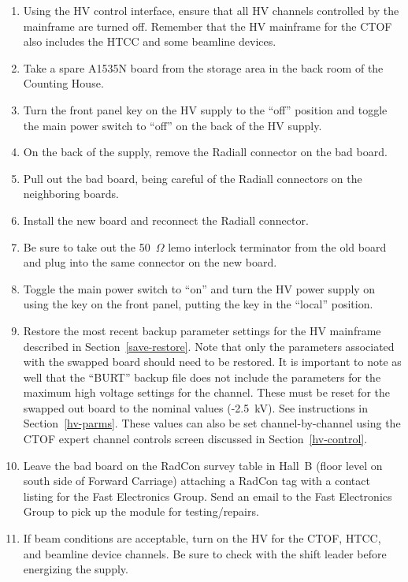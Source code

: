 \documentclass[12pt]{article}
\begin{document}
\begin{enumerate}
\item Using the HV control interface, ensure that all HV channels controlled by the mainframe are turned off.
Remember that the HV mainframe for the CTOF also includes the HTCC and some beamline devices.
\item Take a spare A1535N board from the storage area in the back room of the Counting House.
\item Turn the front panel key on the HV supply to the ``off'' position and toggle the main power switch to
``off'' on the back of the HV supply.
\item On the back of the supply, remove the Radiall connector on the bad board.
\item Pull out the bad board, being careful of the Radiall connectors on the neighboring boards.
\item Install the new board and reconnect the Radiall connector.
\item Be sure to take out the 50~$\Omega$ lemo interlock terminator from the old board and plug into the
same connector on the new board.
\item Toggle the main power switch to ``on'' and turn the HV power supply on using the key on the front panel,
putting the key in the ``local'' position.
\item Restore the most recent backup parameter settings for the HV mainframe described in
Section~\ref{save-restore}. Note that only the parameters associated with the swapped board should need to
be restored. It is important to note as well that the ``BURT'' backup file does not include the parameters for
the maximum high voltage settings for the channel. These must be reset for the swapped out board to the
nominal values (-2.5~kV). See instructions in Section~\ref{hv-parms}. These values can also be set
channel-by-channel using the CTOF expert channel controls screen discussed in Section~\ref{hv-control}.
\item Leave the bad board on the RadCon survey table in Hall~B (floor level on south side of
Forward Carriage) attaching a RadCon tag with a contact listing for the Fast Electronics Group. Send an
email to the Fast Electronics Group to pick up the module for testing/repairs.
\item If beam conditions are acceptable, turn on the HV for the CTOF, HTCC, and beamline device channels. Be
sure to check with the shift leader before energizing the supply.
\end{enumerate}
\end{document}
